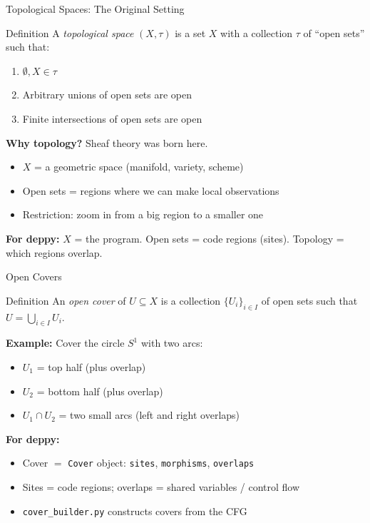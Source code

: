 \documentclass[aspectratio=169,10pt]{beamer}
\begin{document}
\begin{frame}{Topological Spaces: The Original Setting}
\begin{block}{Definition}
A \emph{topological space} $(X, \tau)$ is a set $X$ with a collection $\tau$ of ``open sets'' such that:
\begin{enumerate}
  \item $\emptyset, X \in \tau$
  \item Arbitrary unions of open sets are open
  \item Finite intersections of open sets are open
\end{enumerate}
\end{block}

\vspace{0.3em}
\textbf{Why topology?} Sheaf theory was born here.
\begin{itemize}
  \item $X$ = a geometric space (manifold, variety, scheme)
  \item Open sets = regions where we can make local observations
  \item Restriction: zoom in from a big region to a smaller one
\end{itemize}

\textbf{For deppy:} $X$ = the program. Open sets = code regions (sites). Topology = which regions overlap.
\end{frame}

\begin{frame}{Open Covers}
\begin{block}{Definition}
An \emph{open cover} of $U \subseteq X$ is a collection $\{U_i\}_{i \in I}$ of open sets such that $U = \bigcup_{i \in I} U_i$.
\end{block}

\textbf{Example:} Cover the circle $S^1$ with two arcs:
\begin{itemize}
  \item $U_1$ = top half (plus overlap)
  \item $U_2$ = bottom half (plus overlap)
  \item $U_1 \cap U_2$ = two small arcs (left and right overlaps)
\end{itemize}

\vspace{0.3em}
\textbf{For deppy:}
\begin{itemize}
  \item Cover $=$ \texttt{Cover} object: \texttt{sites}, \texttt{morphisms}, \texttt{overlaps}
  \item Sites = code regions; overlaps = shared variables / control flow
  \item \texttt{cover\_builder.py} constructs covers from the CFG
\end{itemize}
\end{frame}
\end{document}

